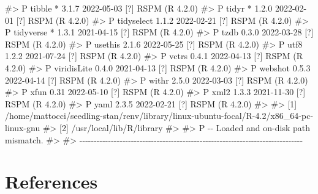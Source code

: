 \documentclass[
  11pt,
  letterpaper,
  DIV=11,
  numbers=noendperiod]{scrartcl}
\newenvironment{Shaded}{}{}
\newcommand{\CommentTok}[1]{\textcolor[rgb]{0.42,0.45,0.49}{#1}}
\begin{document}
\begin{Shaded}
\begin{Highlighting}[]
\CommentTok{\#\textgreater{}  P tibble      * 3.1.7   2022{-}05{-}03 [?] RSPM (R 4.2.0)}
\CommentTok{\#\textgreater{}  P tidyr       * 1.2.0   2022{-}02{-}01 [?] RSPM (R 4.2.0)}
\CommentTok{\#\textgreater{}  P tidyselect    1.1.2   2022{-}02{-}21 [?] RSPM (R 4.2.0)}
\CommentTok{\#\textgreater{}  P tidyverse   * 1.3.1   2021{-}04{-}15 [?] RSPM (R 4.2.0)}
\CommentTok{\#\textgreater{}  P tzdb          0.3.0   2022{-}03{-}28 [?] RSPM (R 4.2.0)}
\CommentTok{\#\textgreater{}  P usethis       2.1.6   2022{-}05{-}25 [?] RSPM (R 4.2.0)}
\CommentTok{\#\textgreater{}  P utf8          1.2.2   2021{-}07{-}24 [?] RSPM (R 4.2.0)}
\CommentTok{\#\textgreater{}  P vctrs         0.4.1   2022{-}04{-}13 [?] RSPM (R 4.2.0)}
\CommentTok{\#\textgreater{}  P viridisLite   0.4.0   2021{-}04{-}13 [?] RSPM (R 4.2.0)}
\CommentTok{\#\textgreater{}  P webshot       0.5.3   2022{-}04{-}14 [?] RSPM (R 4.2.0)}
\CommentTok{\#\textgreater{}  P withr         2.5.0   2022{-}03{-}03 [?] RSPM (R 4.2.0)}
\CommentTok{\#\textgreater{}  P xfun          0.31    2022{-}05{-}10 [?] RSPM (R 4.2.0)}
\CommentTok{\#\textgreater{}  P xml2          1.3.3   2021{-}11{-}30 [?] RSPM (R 4.2.0)}
\CommentTok{\#\textgreater{}  P yaml          2.3.5   2022{-}02{-}21 [?] RSPM (R 4.2.0)}
\CommentTok{\#\textgreater{} }
\CommentTok{\#\textgreater{}  [1] /home/mattocci/seedling{-}stan/renv/library/linux{-}ubuntu{-}focal/R{-}4.2/x86\_64{-}pc{-}linux{-}gnu}
\CommentTok{\#\textgreater{}  [2] /usr/local/lib/R/library}
\CommentTok{\#\textgreater{} }
\CommentTok{\#\textgreater{}  P {-}{-} Loaded and on{-}disk path mismatch.}
\CommentTok{\#\textgreater{} }
\CommentTok{\#\textgreater{} {-}{-}{-}{-}{-}{-}{-}{-}{-}{-}{-}{-}{-}{-}{-}{-}{-}{-}{-}{-}{-}{-}{-}{-}{-}{-}{-}{-}{-}{-}{-}{-}{-}{-}{-}{-}{-}{-}{-}{-}{-}{-}{-}{-}{-}{-}{-}{-}{-}{-}{-}{-}{-}{-}{-}{-}{-}{-}{-}{-}{-}{-}{-}{-}{-}{-}{-}{-}{-}{-}{-}{-}{-}{-}{-}{-}{-}{-}}
\end{Highlighting}
\end{Shaded}

\hypertarget{references}{%
\section*{References}\label{references}}
\end{document}
